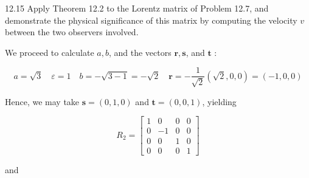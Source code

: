 \documentclass[10pt]{article}
\begin{document}
12.15 Apply Theorem 12.2 to the Lorentz matrix of Problem 12.7, and demonstrate the physical significance of this matrix by computing the velocity $v$ between the two observers involved.

We proceed to calculate $a, b$, and the vectors $\mathbf{r}, \mathbf{s}$, and $\mathbf{t}$ :

$$
a=\sqrt{3} \quad \varepsilon=1 \quad b=-\sqrt{3-1}=-\sqrt{2} \quad \mathbf{r}=-\frac{1}{\sqrt{2}}(\sqrt{2}, 0,0)=(-1,0,0)
$$

Hence, we may take $\mathbf{s}=(0,1,0)$ and $\mathbf{t}=(0,0,1)$, yielding

$$
R_{2}=\left[\begin{array}{rrrr}
1 & 0 & 0 & 0 \\
0 & -1 & 0 & 0 \\
0 & 0 & 1 & 0 \\
0 & 0 & 0 & 1
\end{array}\right]
$$

and
\end{document}
